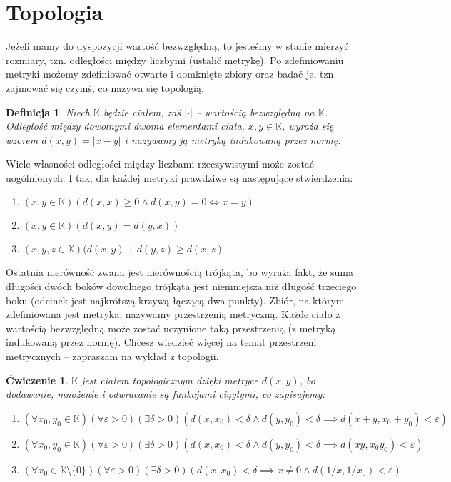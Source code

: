 \documentclass[a4paper,fleqn,9pt]{extarticle}
\newtheorem{prb}[prbh]{\'Cwiczenie}
\newtheorem{dff}{Definicja}
\newenvironment{enumx}{\begin{enumerate}
	\setlength{\itemsep}{0pt}
	\setlength{\parskip}{0pt}
	\setlength{\parsep}{0pt}}
{\end{enumerate}}
\begin{document}
\section{Topologia}
Jeżeli mamy do dyspozycji wartość bezwzględną, to jesteśmy w stanie mierzyć rozmiary, tzn. odległości między liczbymi (ustalić metrykę). Po zdefiniowaniu metryki możemy zdefiniować otwarte i domknięte zbiory oraz badać je, tzn. zajmować się czymś, co nazywa się topologią.

\begin{dff}Niech $\mathbb K$ będzie ciałem, zaś $|\cdot|$ -- wartością bezwzględną na $\mathbb K$. Odległość między dowolnymi dwoma elementami ciała, $x,y\in\mathbb K$, wyraża się wzorem $d(x,y) = |x-y|$ i nazywamy ją metryką indukowaną przez normę.\end{dff}

Wiele własności odległości między liczbami rzeczywistymi może zostać uogólnionych. I tak, dla każdej metryki prawdziwe są następujące stwierdzenia:
\begin{enumx}
\item $(x,y \in \mathbb K) (d(x,x) \ge 0 \wedge d(x,y) = 0 \iff x = y)$
\item $(x,y \in \mathbb K) (d(x,y) = d(y,x))$
\item $(x,y,z \in \mathbb K) (d(x,y) + d(y,z) \ge d(x,z)$
\end{enumx}

Ostatnia nierówność zwana jest nierównością trójkąta, bo wyraża fakt, że suma długości dwóch boków dowolnego trójkąta jest niemniejsza niż długość trzeciego boku (odcinek jest najkrótszą krzywą łączącą dwa punkty). Zbiór, na którym zdefiniowana jest metryka, nazywamy przestrzenią metryczną. Każde ciało z wartością bezwzględną może zostać uczynione taką przestrzenią (z metryką indukowaną przez normę). Chcesz wiedzieć więcej na temat przestrzeni metrycznych -- zapraszam na wykład z topologii.

\begin{prb}$\mathbb K$ jest ciałem topologicznym dzięki metryce $d(x,y)$, bo dodawanie, mnożenie i odwracanie są funkcjami ciągłymi, co zapisujemy:
\begin{enumx}
\item $(\forall x_0, y_0 \in \mathbb K) (\forall \varepsilon > 0) (\exists \delta > 0)(d(x,x_0) < \delta \wedge d(y,y_0) < \delta \implies d(x+y,x_0+y_0) < \varepsilon)$
\item $(\forall x_0, y_0 \in \mathbb K) (\forall \varepsilon > 0) (\exists \delta > 0)(d(x,x_0) < \delta \wedge d(y,y_0) < \delta \implies d(xy,x_0y_0) < \varepsilon)$
\item $(\forall x_0 \in \mathbb K\setminus\{0\}) (\forall \varepsilon > 0) (\exists \delta > 0)(d(x,x_0) < \delta \implies x \neq 0 \wedge d(1/x, 1/x_0) < \varepsilon)$
\end{enumx}\end{prb}
\end{document}

